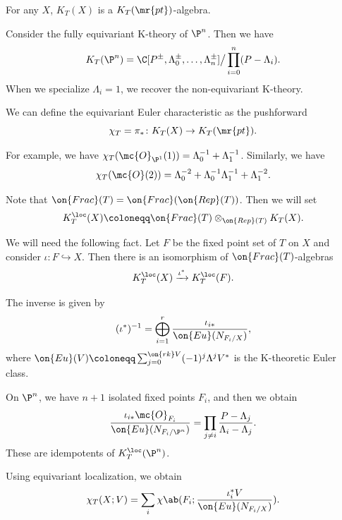 \begin{rmk}
    For any \(X\), \(K_T(X)\) is a \(K_T(\mr{pt})\)-algebra.
\end{rmk}

\begin{exm}
    Consider the fully equivariant K-theory of \(\P^n\). Then we have
    \[ K_T(\P^n) = \C[P^{\pm}, \Lambda_0^{\pm}, \ldots, \Lambda_n^{\pm}] \big/ \prod_{i=0}^n (P-\Lambda_i). \]
    When we specialize \(\Lambda_i = 1\), we recover the non-equivariant K-theory.
\end{exm}

\begin{defn}
    We can define the equivariant Euler characteristic as the pushforward
    \[ \chi_T = \pi_* \colon K_T(X) \to K_T(\mr{pt}). \]
\end{defn}

\begin{exm}
    For example, we have \(\chi_T(\mc{O}_{\P^1}(1)) = \Lambda_0^{-1} + \Lambda_1^{-1}\). Similarly, we have
    \[ \chi_T(\mc{O}(2)) = \Lambda_0^{-2} + \Lambda_0^{-1} \Lambda_1^{-1} + \Lambda_1^{-2}. \]
\end{exm}

\begin{notn}
    Note that \(\on{Frac}(T) = \on{Frac}(\on{Rep}(T))\). Then we will set
    \[ K_T^{\loc}(X) \coloneqq \on{Frac}(T) \otimes_{\on{Rep}(T)} K_T(X). \]
\end{notn}

We will need the following fact. Let \(F\) be the fixed point set of \(T\) on \(X\) and consider \(\iota \colon F \hookrightarrow X\). Then there is an isomorphism of \(\on{Frac}(T)\)-algebras
\[ K_T^{\loc}(X) \xrightarrow{\iota^*} K_T^{\loc}(F). \]

\begin{rmk}
    The inverse is given by
    \[ (\iota^*)^{-1} = \bigoplus_{i=1}^r \frac{\iota_{i*}}{\on{Eu}(N_{F_i/X})}, \]
    where \(\on{Eu}(V) \coloneqq \sum_{j = 0}^{\on{rk} V} (-1)^j \Lambda^j V^*\) is the K-theoretic Euler class.
\end{rmk}

\begin{exm}
    On \(\P^n\), we have \(n+1\) isolated fixed points \(F_i\), and then we obtain
    \[ \frac{\iota_{i*} \mc{O}_{F_i}}{\on{Eu}(N_{F_i/\P^n})} = \prod_{j \neq i} \frac{P - \Lambda_j}{\Lambda_i - \Lambda_j}. \]
    These are idempotents of \(K_T^{\loc}(\P^n)\).
\end{exm}

Using equivariant localization, we obtain
\[ \chi_T(X; V) = \sum_i \chi\ab(F_i; \frac{\iota_i^* V}{\on{Eu}(N_{F_i/X})}). \]

